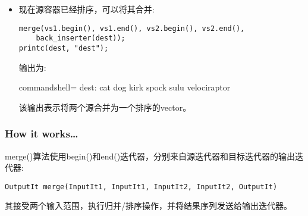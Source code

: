 \begin{itemize}
\item 
现在源容器已经排序，可以将其合并:

\begin{lstlisting}[style=styleCXX]
merge(vs1.begin(), vs1.end(), vs2.begin(), vs2.end(),
	back_inserter(dest));
printc(dest, "dest");
\end{lstlisting}

输出为:

\begin{tcblisting}{commandshell={}}
dest: cat dog kirk spock sulu velociraptor
\end{tcblisting}

该输出表示将两个源合并为一个排序的vector。
\end{itemize}

\subsubsection{How it works…}

merge()算法使用begin()和end()迭代器，分别来自源迭代器和目标迭代器的输出迭代器:

\begin{lstlisting}[style=styleCXX]
OutputIt merge(InputIt1, InputIt1, InputIt2, InputIt2, OutputIt)
\end{lstlisting}

其接受两个输入范围，执行归并/排序操作，并将结果序列发送给输出迭代器。


















